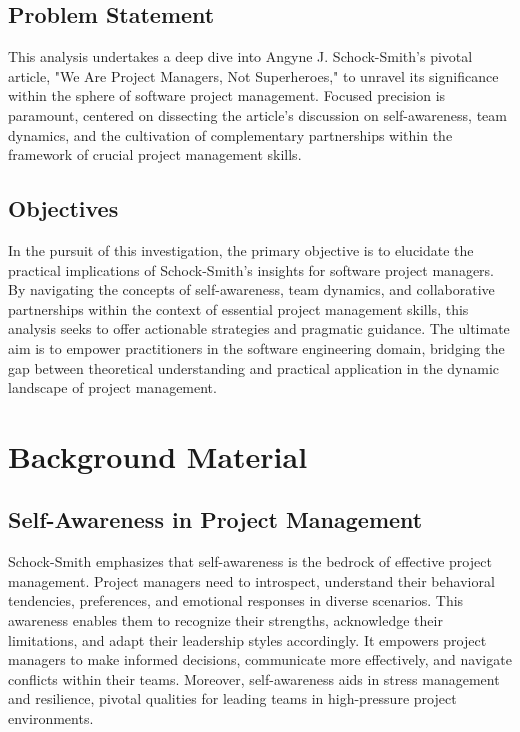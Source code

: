 \documentclass[runningheads]{llncs}
\begin{document}
\subsection{Problem Statement}
This analysis undertakes a deep dive into Angyne J. Schock-Smith's pivotal article, "We Are Project Managers, Not Superheroes," to unravel its significance within the sphere of software project management. Focused precision is paramount, centered on dissecting the article's discussion on self-awareness, team dynamics, and the cultivation of complementary partnerships within the framework of crucial project management skills.

\subsection{Objectives}
In the pursuit of this investigation, the primary objective is to elucidate the practical implications of Schock-Smith's insights for software project managers. By navigating the concepts of self-awareness, team dynamics, and collaborative partnerships within the context of essential project management skills, this analysis seeks to offer actionable strategies and pragmatic guidance. The ultimate aim is to empower practitioners in the software engineering domain, bridging the gap between theoretical understanding and practical application in the dynamic landscape of project management.


\section{Background Material}

\subsection{Self-Awareness in Project Management}
Schock-Smith emphasizes that self-awareness is the bedrock of effective project management. Project managers need to introspect, understand their behavioral tendencies, preferences, and emotional responses in diverse scenarios. This awareness enables them to recognize their strengths, acknowledge their limitations, and adapt their leadership styles accordingly. It empowers project managers to make informed decisions, communicate more effectively, and navigate conflicts within their teams. Moreover, self-awareness aids in stress management and resilience, pivotal qualities for leading teams in high-pressure project environments.
\end{document}
